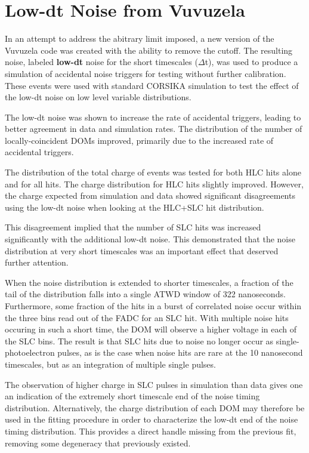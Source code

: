 \label{sec:lowdt_vuvuzela}
\section{Low-dt Noise from Vuvuzela}
In an attempt to address the abitrary limit imposed, a new version of the Vuvuzela code was created with the ability to remove the cutoff.
The resulting noise, labeled \textbf{low-dt} noise for the short timescales ($\Delta$t), was used to produce a simulation of accidental noise triggers for testing without further calibration.
These events were used with standard CORSIKA simulation to test the effect of the low-dt noise on low level variable distributions.

The low-dt noise was shown to increase the rate of accidental triggers, leading to better agreement in data and simulation rates.
The distribution of the number of locally-coincident DOMs improved, primarily due to the increased rate of accidental triggers.

The distribution of the total charge of events was tested for both HLC hits alone and for all hits. 
The charge distribution for HLC hits slightly improved.
However, the charge expected from simulation and data showed significant disagreements using the low-dt noise when looking at the HLC+SLC hit distribution.

This disagreement implied that the number of SLC hits was increased significantly with the additional low-dt noise. 
This demonstrated that the noise distribution at very short timescales was an important effect that deserved further attention.

When the noise distribution is extended to shorter timescales, a fraction of the tail of the distribution falls into a single ATWD window of 322 nanoseconds.
Furthermore, some fraction of the hits in a burst of correlated noise occur within the three bins read out of the FADC for an SLC hit.
With multiple noise hits occuring in such a short time, the DOM will observe a higher voltage in each of the SLC bins.
The result is that SLC hits due to noise no longer occur as single-photoelectron pulses, as is the case when noise hits are rare at the 10 nanosecond timescales, but as an integration of multiple single pulses.

The observation of higher charge in SLC pulses in simulation than data  gives one an indication of the extremely short timescale end of the noise timing distribution.
Alternatively, the charge distribution of each DOM may therefore be used in the fitting procedure in order to characterize the low-dt end of the noise timing distribution.
This provides a direct handle missing from the previous fit, removing some degeneracy that previously existed.

